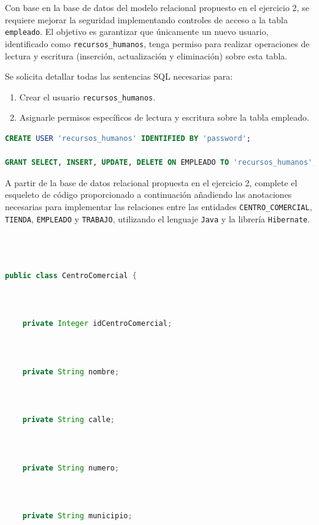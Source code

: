 \documentclass[
    12pt,
    a4paper,
    addpoints,
    answers,
    convocatoria=ord,
    titulacion=NoCD,
    curso=2024/2025,
]{db-exam}
\begin{document}
\begin{questions}
\newpage
\question[\half] Con base en la base de datos del modelo relacional propuesto en el ejercicio 2, se requiere mejorar la seguridad implementando controles de acceso a la tabla \texttt{empleado}. El objetivo es garantizar que únicamente un nuevo usuario, identificado como \texttt{recursos\_humanos}, tenga permiso para realizar operaciones de lectura y escritura (inserción, actualización y eliminación) sobre esta tabla.

Se solicita detallar todas las sentencias SQL necesarias para:
\begin{enumerate}
    \item Crear el usuario \texttt{recursos\_humanos}.
    \item Asignarle permisos específicos de lectura y escritura sobre la tabla empleado.
\end{enumerate}


\begin{solution}
\begin{lstlisting}[language=SQL]
CREATE USER 'recursos_humanos' IDENTIFIED BY 'password';

GRANT SELECT, INSERT, UPDATE, DELETE ON EMPLEADO TO 'recursos_humanos';

\end{lstlisting}       
\end{solution}

\newpage
\question[1] A partir de la base de datos relacional propuesta en el ejercicio 2, complete el esqueleto de código proporcionado a continuación añadiendo las anotaciones necesarias para implementar las relaciones entre las entidades \texttt{CENTRO\_COMERCIAL}, \texttt{TIENDA}, \texttt{EMPLEADO} y \texttt{TRABAJO}, utilizando el lenguaje \texttt{Java} y la librería \texttt{Hibernate}.

\begin{lstlisting}[language=Java]



public class CentroComercial {

    
    
    private Integer idCentroComercial;


    
    private String nombre;


    
    private String calle;


    
    private String numero;


    
    private String municipio;



\end{lstlisting}
\end{questions}
\end{document}
